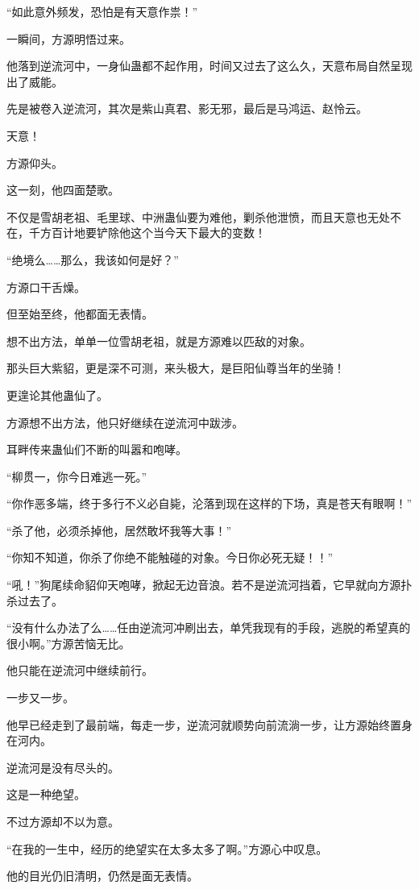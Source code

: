 \begin{this_body}
“如此意外频发，恐怕是有天意作祟！”

一瞬间，方源明悟过来。

他落到逆流河中，一身仙蛊都不起作用，时间又过去了这么久，天意布局自然呈现出了威能。

先是被卷入逆流河，其次是紫山真君、影无邪，最后是马鸿运、赵怜云。

天意！

方源仰头。

这一刻，他四面楚歌。

不仅是雪胡老祖、毛里球、中洲蛊仙要为难他，剿杀他泄愤，而且天意也无处不在，千方百计地要铲除他这个当今天下最大的变数！

“绝境么……那么，我该如何是好？”

方源口干舌燥。

但至始至终，他都面无表情。

想不出方法，单单一位雪胡老祖，就是方源难以匹敌的对象。

那头巨大紫貂，更是深不可测，来头极大，是巨阳仙尊当年的坐骑！

更遑论其他蛊仙了。

方源想不出方法，他只好继续在逆流河中跋涉。

耳畔传来蛊仙们不断的叫嚣和咆哮。

“柳贯一，你今日难逃一死。”

“你作恶多端，终于多行不义必自毙，沦落到现在这样的下场，真是苍天有眼啊！”

“杀了他，必须杀掉他，居然敢坏我等大事！”

“你知不知道，你杀了你绝不能触碰的对象。今日你必死无疑！！”

“吼！”狗尾续命貂仰天咆哮，掀起无边音浪。若不是逆流河挡着，它早就向方源扑杀过去了。

“没有什么办法了么……任由逆流河冲刷出去，单凭我现有的手段，逃脱的希望真的很小啊。”方源苦恼无比。

他只能在逆流河中继续前行。

一步又一步。

他早已经走到了最前端，每走一步，逆流河就顺势向前流淌一步，让方源始终置身在河内。

逆流河是没有尽头的。

这是一种绝望。

不过方源却不以为意。

“在我的一生中，经历的绝望实在太多太多了啊。”方源心中叹息。

他的目光仍旧清明，仍然是面无表情。


\end{this_body}
